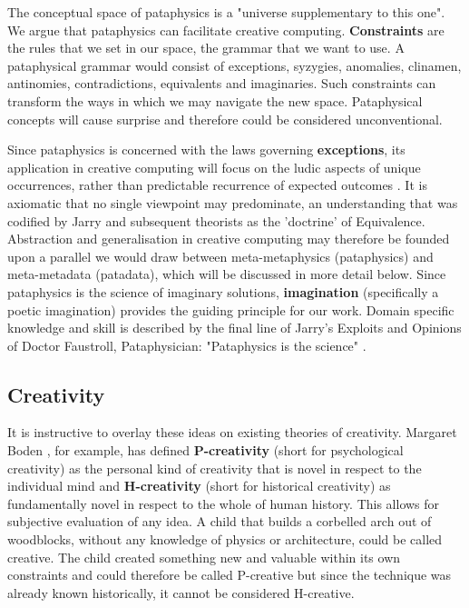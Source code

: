 The conceptual space of pataphysics is a "universe supplementary to this one"\citep[p.21]{Jarry1996}. We argue that pataphysics can facilitate creative computing. \textbf{Constraints} are the rules that we set in our space, the grammar that we want to use. A pataphysical grammar would consist of exceptions, syzygies, anomalies, clinamen, antinomies, contradictions, equivalents and imaginaries. Such constraints can transform the ways in which we may navigate the new space. Pataphysical concepts will cause surprise and therefore could be considered unconventional.

Since pataphysics is concerned with the laws governing \textbf{exceptions}, its application in creative computing will focus on the ludic aspects of unique occurrences, rather than predictable recurrence of expected outcomes \citep{Bok2002}. It is axiomatic that no single viewpoint may predominate, an understanding that was codified by Jarry and subsequent theorists as the 'doctrine' of Equivalence. Abstraction and generalisation in creative computing may therefore be founded upon a parallel we would draw between meta-metaphysics (pataphysics) and meta-metadata (patadata), which will be discussed in more detail below. Since pataphysics is the science of imaginary solutions, \textbf{imagination} (specifically a poetic imagination) provides the guiding principle for our work. Domain specific knowledge and skill is described by the final line of Jarry's Exploits and Opinions of Doctor Faustroll, Pataphysician: "Pataphysics is the science" \citep[p.114]{Jarry1996}.

\subsection{Creativity}

It is instructive to overlay these ideas on existing theories of creativity. Margaret Boden \citep{Boden2003}, for example, has defined \textbf{P-creativity} (short for psychological creativity) as the personal kind of creativity that is novel in respect to the individual mind and \textbf{H-creativity} (short for historical creativity) as fundamentally novel in respect to the whole of human history. This allows for subjective evaluation of any idea. A child that builds a corbelled arch out of woodblocks, without any knowledge of physics or architecture, could be called creative. The child created something new and valuable within its own constraints and could therefore be called P-creative but since the technique was already known historically, it cannot be considered H-creative.

